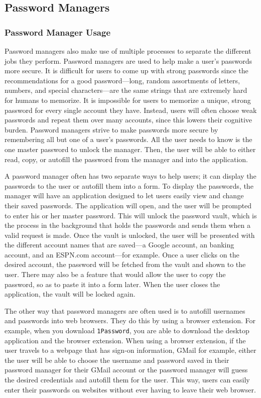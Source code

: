 \subsection{Password Managers}
\label{sec:passwordManagers}
\subsubsection{Password Manager Usage}
\label{sec:passwordManagerUsage}
Password managers also make use of multiple processes to separate the different jobs they perform.  Password managers are used to help make a user's passwords more secure.  It is difficult for users to come up with strong passwords since the recommendations for a good password---long, random assortments of letters, numbers, and special characters---are the same strings that are extremely hard for humans to memorize.  It is impossible for users to memorize a unique, strong password for every single account they have.  Instead, users will often choose weak passwords and repeat them over many accounts, since this lowers their cognitive burden.  Password managers strive to make passwords more secure by remembering all but one of a user's passwords.  All the user needs to know is the one master password to unlock the manager.  Then, the user will be able to either read, copy, or autofill the password from the manager and into the application.

A password manager often has two separate ways to help users; it can display the passwords to the user or autofill them into a form.  To display the passwords, the manager will have an application designed to let users easily view and change their saved passwords.  The application will open, and the user will be prompted to enter his or her master password.  This will unlock the password vault, which is the process in the background that holds the passwords and sends them when a valid request is made.  Once the vault is unlocked, the user will be presented with the different account names that are saved---a Google account, an banking account, and an ESPN.com account---for example.  Once a user clicks on the desired account, the password will be fetched from the vault and shown to the user.  There may also be a feature that would allow the user to copy the password, so as to paste it into a form later.  When the user closes the application, the vault will be locked again.

The other way that password managers are often used is to autofill usernames and passwords into web browsers.  They do this by using a browser extension.  For example, when you download \texttt{1Password}, you are able to download the desktop application and the browser extension.  When using a browser extension, if the user travels to a webpage that has sign-on information, GMail for example, either the user will be able to choose the username and password saved in their password manager for their GMail account or the password manager will guess the desired credentials and autofill them for the user.  This way, users can easily enter their passwords on websites without ever having to leave their web browser.

